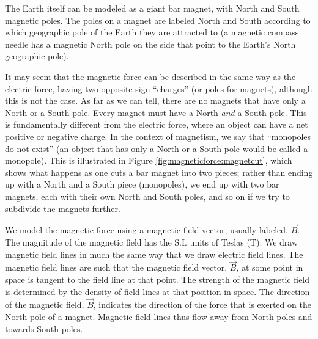 The Earth itself can be modeled as a giant bar magnet, with North and South magnetic poles. The poles on a magnet are labeled North and South according to which geographic pole of the Earth they are attracted to (a magnetic compass needle has a magnetic North pole on the side that point to the Earth's North geographic pole).

It may seem that the magnetic force can be described in the same way as the electric force, having two opposite sign ``charges'' (or poles for magnets), although this is not the case. As far as we can tell, there are no magnets that have only a North or a South pole. Every magnet must have a North \textit{and} a South pole. This is fundamentally different from the electric force, where an object can have a net positive or negative charge. In the context of magnetism, we say that ``monopoles do not exist'' (an object that has only a North or a South pole would be called a monopole). This is illustrated in Figure \ref{fig:magneticforce:magnetcut}, which shows what happens as one cuts a bar magnet into two pieces; rather than ending up with a North and a South piece (monopoles), we end up with two bar magnets, each with their own North and South poles, and so on if we try to subdivide the magnets further.


We model the magnetic force using a magnetic field vector, usually labeled, $\vec B$. The magnitude of the magnetic field has the S.I. units of Teslas (\si{T}). We draw magnetic field lines in much the same way that we draw electric field lines. The magnetic field lines are such that the magnetic field vector, $\vec B$, at some point in space is tangent to the field line at that point. The strength of the magnetic field is determined by the density of field lines at that position in space. The direction of the magnetic field, $\vec B$, indicates the direction of the force that is exerted on the North pole of a magnet. Magnetic field lines thus flow away from North poles and towards South poles. 

